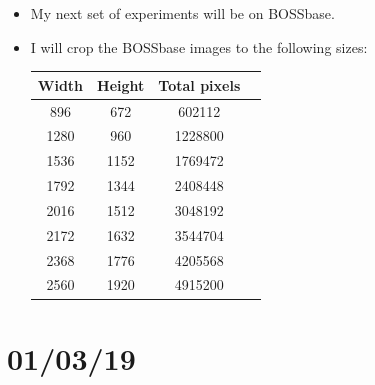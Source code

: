 \documentclass[11pt,a4paper]{report}
\begin{document}
\begin{itemize}
\begin{itemize}
    \end{itemize}

  \item My next set of experiments will be on BOSSbase.

  \item I will crop the BOSSbase images to the following sizes:
  \begin{center}
  \begin{tabular}{ c c | c c }
  Width & Height & Total pixels \\ \hline
  896 & 672 & 602112 \\
  1280 & 960 & 1228800 \\
  1536 & 1152 & 1769472 \\
  1792 & 1344 & 2408448 \\
  2016 & 1512 & 3048192 \\
  2172 & 1632 & 3544704 \\
  2368 & 1776 & 4205568 \\
  2560 & 1920 & 4915200 \\
  \end{tabular}
  \end{center}

\end{itemize}


\section{01/03/19}
\end{document}
